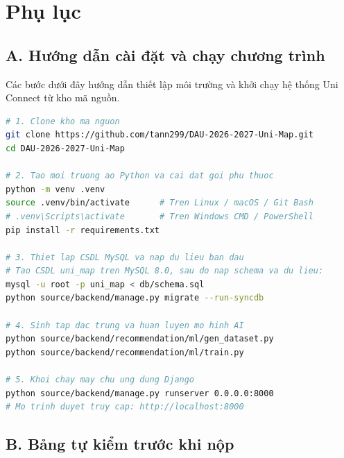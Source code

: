 \chapter{Phụ lục}

\section*{A. Hướng dẫn cài đặt và chạy chương trình}
{}

Các bước dưới đây hướng dẫn thiết lập môi trường và khởi chạy hệ thống Uni Connect từ kho mã nguồn.

\begin{lstlisting}[language=bash, caption={Quy trình cài đặt cơ sở dữ liệu, huấn luyện và khởi chạy Uni Connect.}]
# 1. Clone kho ma nguon
git clone https://github.com/tann299/DAU-2026-2027-Uni-Map.git
cd DAU-2026-2027-Uni-Map

# 2. Tao moi truong ao Python va cai dat goi phu thuoc
python -m venv .venv
source .venv/bin/activate      # Tren Linux / macOS / Git Bash
# .venv\Scripts\activate       # Tren Windows CMD / PowerShell
pip install -r requirements.txt

# 3. Thiet lap CSDL MySQL va nap du lieu ban dau
# Tao CSDL uni_map tren MySQL 8.0, sau do nap schema va du lieu:
mysql -u root -p uni_map < db/schema.sql
python source/backend/manage.py migrate --run-syncdb

# 4. Sinh tap dac trung va huan luyen mo hinh AI
python source/backend/recommendation/ml/gen_dataset.py
python source/backend/recommendation/ml/train.py

# 5. Khoi chay may chu ung dung Django
python source/backend/manage.py runserver 0.0.0.0:8000
# Mo trinh duyet truy cap: http://localhost:8000
\end{lstlisting}

\section*{B. Bảng tự kiểm trước khi nộp}
{}

